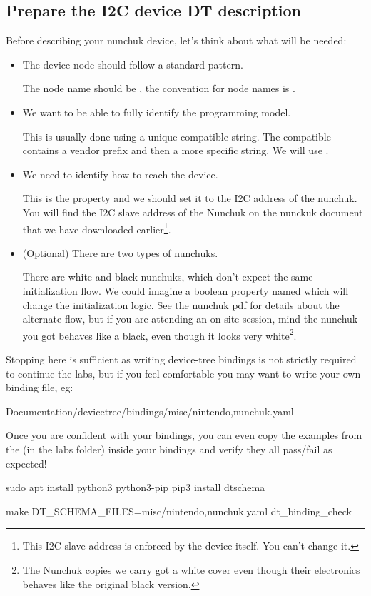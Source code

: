 
\subsection{Prepare the I2C device DT description}

Before describing your nunchuk device, let's think about what will be
needed:
\begin{itemize}
\item The device node should follow a standard pattern.

  The node name should be , the convention for node
  names is .

\item We want to be able to fully identify the programming model.

  This is usually done using a unique compatible string. The compatible
  contains a vendor prefix and then a more specific string. We will use
  .

\item We need to identify how to reach the device.

  This is the  property and we should set it to the I2C
  address of the nunchuk. You will find the I2C slave address of the
  Nunchuk on the nunckuk document that we have downloaded
  earlier\footnote{This I2C slave address is enforced by the device
    itself. You can't change it.}.

\item (Optional) There are two types of nunchuks.

  There are white and black nunchuks, which don't expect the same
  initialization flow. We could imagine a boolean property named
   which will change the initialization
  logic. See the nunchuk pdf for details about the alternate flow, but if you
  are attending an on-site session, mind the nunchuk you got behaves like a
  black, even though it looks very white\footnote{The Nunchuk copies we
  carry got a white cover even though their electronics behaves like the
  original black version.}.

\end{itemize}

Stopping here is sufficient as writing device-tree bindings is not
strictly required to continue the labs, but if you feel comfortable
you may want to write your own binding file, eg:
\begin{bashinput}
Documentation/devicetree/bindings/misc/nintendo,nunchuk.yaml
\end{bashinput}
Once you are confident with your bindings, you can even copy the
examples from the  (in the
 labs folder) inside your bindings and verify they all
pass/fail as expected!
\begin{bashinput}
sudo apt install python3 python3-pip
pip3 install dtschema

make DT_SCHEMA_FILES=misc/nintendo,nunchuk.yaml dt_binding_check
\end{bashinput}

